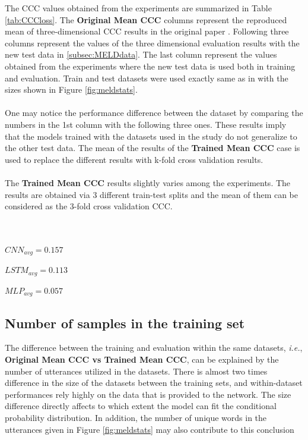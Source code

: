 \documentclass[a4paper,11pt]{article}
\begin{document}
\indent The CCC values obtained from the experiments are summarized in Table \ref{tab:CCCloss}. The \textbf{Original Mean CCC} columns represent the reproduced mean of three-dimensional CCC results in the original paper \cite{atmaja2020deep}. Following three columns represent the values of the three dimensional evaluation results with the new test data in \ref{subsec:MELDdata}. The last column represent the values obtained from the experiments where the new test data is used both in training and evaluation. Train and test datasets were used exactly same as in \cite{poria2018meld} with the sizes shown in Figure \ref{fig:meldstats}.
\\
\\
One may notice the performance difference between the dataset by comparing the numbers in the 1st column with the following three ones. These results imply that the models trained with the datasets used in the study do not generalize to the other test data. The mean of the results of the \textbf{Trained Mean CCC} case is used to replace the different results with k-fold cross validation results. 
\\
\\
The  \textbf{Trained Mean CCC} results slightly varies among the experiments. The results are obtained via 3 different train-test splits and the mean of them can be considered as the 3-fold cross validation CCC. \\
\\
\\
\begin{minipage}{0.3\textwidth}
    \centering
    $CNN_{avg} = 0.157$            
\end{minipage}
\begin{minipage}{0.3\textwidth}
    \centering
    $LSTM_{avg} = 0.113$             
\end{minipage}
\begin{minipage}{0.3\textwidth}
    \centering
   $MLP_{avg} = 0.057$ 
\end{minipage}

\pagebreak 

\subsection{Number of samples in the training set}
The difference between the training and evaluation within the same datasets, \textit{i.e.}, \textbf{Original Mean CCC vs Trained Mean CCC}, can be explained by the number of utterances utilized in the datasets. There is almost two times difference in the size of the datasets between the training sets, and within-dataset performances rely highly on the data that is provided to the network. The size difference directly affects to which extent the model can fit the conditional probability distribution. In addition, the number of unique words in the utterances given in Figure \ref{fig:meldstats} may also contribute to this conclusion
\end{document}
